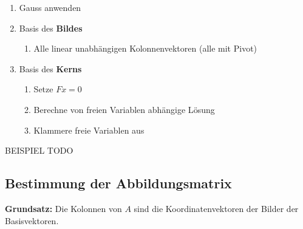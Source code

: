 \documentclass[11pt]{article}
\begin{document}
\begin{enumerate}[noitemsep]
	\item Gauss anwenden
	\item Basis des \textbf{Bildes}
	\begin{enumerate}
		\item Alle linear unabh{\"a}ngigen Kolonnenvektoren (alle mit Pivot)
	\end{enumerate}
	\item Basis des \textbf{Kerns}
	\begin{enumerate}
		\item Setze $Fx = 0$
		\item Berechne von freien Variablen abh{\"a}ngige L{\"o}sung
		\item Klammere freie Variablen aus
	\end{enumerate}
\end{enumerate}

BEISPIEL TODO

\subsection{Bestimmung der Abbildungsmatrix}

\begin{center}
	\textbf{Grundsatz:} Die Kolonnen von $A$ sind die Koordinatenvektoren der Bilder der Basisvektoren.
\end{center}
\end{document}
